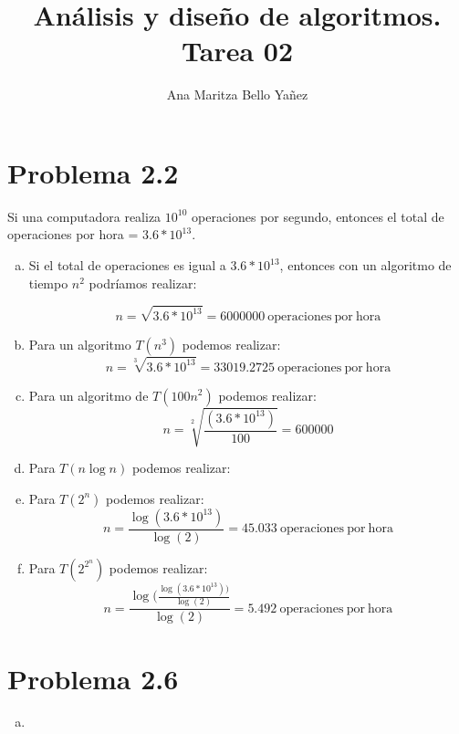 \documentclass{article}
\begin{document}
\title{Análisis y diseño de algoritmos. \\ Tarea 02}
\author{Ana Maritza Bello Yañez}
\maketitle

\section*{Problema 2.2}

Si una computadora realiza $ 10^{10} $ operaciones por segundo, entonces el
total de operaciones por hora = $3.6 * 10^{13} $.

\begin{enumerate}[(a)]
\item Si el total de operaciones es igual a $3.6 * 10^{13} $, entonces con un
algoritmo de tiempo $n^2$ podríamos realizar:

    \begin{equation}
        n = \sqrt{3.6 * 10^{13}} = 6000000 \mathrm{\ operaciones\ por\ hora}
    \end{equation}

\item Para un algoritmo $T(n^3)$ podemos realizar:
    \begin{equation}
        n = \sqrt[3]{3.6 * 10^{13}} = 33019.2725 \mathrm{\ operaciones\ por\ hora}
    \end{equation}

\item Para un algoritmo de $T(100 n^2)$ podemos realizar:
    \begin{equation}
        n = \sqrt[2]{\frac{(3.6 * 10^{13})}{100}} = 600000 
    \end{equation}

\item Para $T(n \log{n})$ podemos realizar:

\item Para $T(2^n)$ podemos realizar:
    \begin{equation}
        n = \frac{\log(3.6 * 10^{13})}{\log(2)} = 45.033 \mathrm{\ operaciones\ por\ hora}
    \end{equation}

\item Para $T(2^{2^n})$ podemos realizar:
    \begin{equation}
        n = \frac{\log(\frac{\log(3.6 * 10^{13}))}{\log(2)}}{\log(2)} = 5.492 \mathrm{\ operaciones\ por\ hora}
    \end{equation}

\end{enumerate}

\section*{Problema 2.6}

\begin{enumerate}[(a)]
    \item
\end{enumerate}
\end{document}
